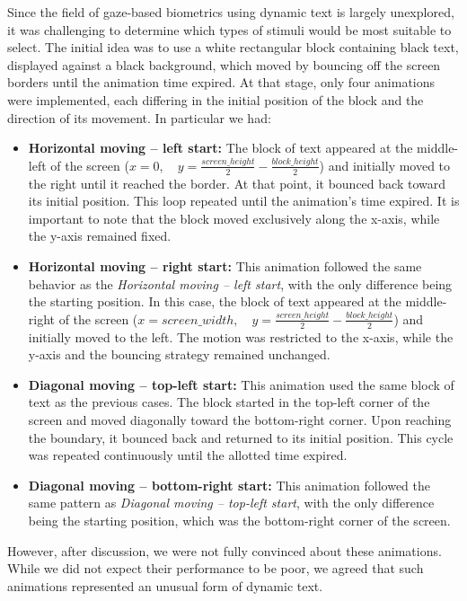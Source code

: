 \documentclass{article}
\begin{document}
Since the field of gaze-based biometrics using dynamic text is largely unexplored, it was challenging to determine which types of stimuli would be most suitable to select.
The initial idea was to use a white rectangular block containing black text, displayed against a black background, which moved by bouncing off the screen borders until the animation time expired.
At that stage, only four animations were implemented, each differing in the initial position of the block and the direction of its movement.
In particular we had:
\begin{itemize}
    \item \textbf{Horizontal moving – left start:} The block of text appeared at the middle-left of the screen (\( x = 0, \quad y = \frac{screen\_height}{2} - \frac{block\_height}{2} \)) and initially moved to the right until it reached the border. 
    At that point, it bounced back toward its initial position. 
    This loop repeated until the animation's time expired. 
    It is important to note that the block moved exclusively along the x-axis, while the y-axis remained fixed.
    \item \textbf{Horizontal moving – right start:} This animation followed the same behavior as the \textit{Horizontal moving – left start}, with the only difference being the starting position. 
    In this case, the block of text appeared at the middle-right of the screen (\( x = screen\_width, \quad y = \frac{screen\_height}{2} - \frac{block\_height}{2} \)) and initially moved to the left.
    The motion was restricted to the x-axis, while the y-axis and the bouncing strategy remained unchanged.
    \item \textbf{Diagonal moving – top-left start:} This animation used the same block of text as the previous cases. 
    The block started in the top-left corner of the screen and moved diagonally toward the bottom-right corner. 
    Upon reaching the boundary, it bounced back and returned to its initial position. 
    This cycle was repeated continuously until the allotted time expired.
    \item \textbf{Diagonal moving – bottom-right start:} This animation followed the same pattern as \textit{Diagonal moving – top-left start}, with the only difference being the starting position, which was the bottom-right corner of the screen.
\end{itemize}
However, after discussion, we were not fully convinced about these animations. 
While we did not expect their performance to be poor, we agreed that such animations represented an unusual form of dynamic text. 
\end{document}
